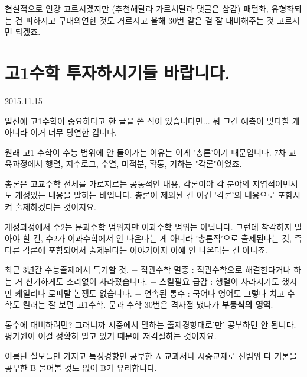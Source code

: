 현실적으로 인강 고르시겠지만 (추천해달라 가르쳐달라 댓글은 삼감)
패턴화, 유형화되는 건 피하시고 구태의연한 것도 거르시고 올해 30번 같은 걸 잘 대비해주는 것 고르시면 되겠죠.
\vspace{5mm}






\section{고1수학 투자하시기들 바랍니다.}
\href{https://www.kockoc.com/Apoc/490501}{2015.11.15}

\vspace{5mm}

일전에 고1수학이 중요하다고 한 글을 쓴 적이 있습니다만... 뭐 그건 예측이 맞다할 게 아니라 이거 너무 당연한 겁니다.
\vspace{5mm}

원래 고1 수학이 수능 범위에 안 들어가는 이유는
이게 '총론'이기 때문입니다.
7차 교육과정에서 행렬, 지수로그, 수열, 미적분, 확통, 기하는 "각론"이었죠.
\vspace{5mm}

총론은 고교수학 전체를 가로지르는 공통적인 내용,
각론이야 각 분야의 지엽적이면서도 개성있는 내용을 말하는 바입니다.
총론이 제외된 건 이건 '각론'의 내용으로 포함시켜 출제하겠다는 것이지요.
\vspace{5mm}

개정과정에서 수2는 문과수학 범위지만 이과수학 범위는 아닙니다.
그런데 착각하지 말아야 할 건, 수2가 이과수학에서 안 나온다는 게 아니라 '총론적'으로 출제된다는 것,
즉 다른 각론에 포함되어서 출제된다는 이야기이지 아예 안 나온다는 건 아니죠.
\vspace{5mm}

최근 3년간 수능출제에서 특기할 것.
$-$ 직관수학 멸종 : 직관수학으로 해결한다거나 하는 거 신기하게도 소리없이 사라졌습니다.
$-$ 스킬필요 급감 : 행렬이 사라지기도 했지만 케일리나 로피탈 논쟁도 없습니다.
$-$ 연속된 통수 : 국어나 영어도 그렇다 치고 수학도 킬러는 잘 보면 고1수학. 문과 수학 30번은 격자점 냈다가 \textbf{부등식의 영역}.
\vspace{5mm}

통수에 대비하려면? 그러니까 시중에서 말하는 출제경향대로'만' 공부하면 안 됩니다.
평가원이 이걸 정확히 알고 있기 때문에 저격질하는 것이지요.
\vspace{5mm}

이름난 실모들만 가지고 특정경향만 공부한 A
교과서나 시중교재로 전범위 다 기본을 공부한 B
물어볼 것도 없이 B가 유리합니다.
\vspace{5mm}

